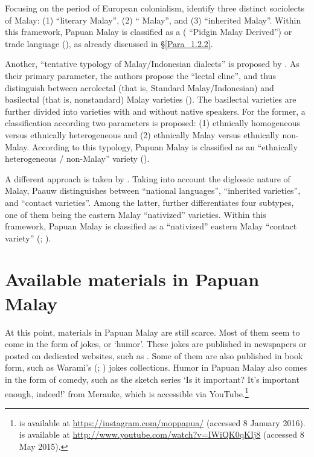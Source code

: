 {Focusing on the period of European colonialism, \cite{Adelaar.1996} identify three distinct sociolects of Malay: (1)  ``literary Malay'', (2)  `` Malay'', and (3)  ``inherited Malay''. Within this framework, Papuan Malay is classified as a ( ``Pidgin Malay Derived'')  or trade language (\citeyear*[675]{Adelaar.1996}), as already discussed in §\ref{Para_1.2.2}.



Another,  ``tentative typology of Malay/Indonesian dialects'' is proposed by \cite{Gil.1997}. As their primary parameter, the authors propose the  ``lectal cline'', and thus distinguish between acrolectal (that is, Standard Malay/Indonesian) and basilectal (that is, nonstandard) Malay varieties (\citeyear*[1]{Gil.1997}). The basilectal varieties are further divided into varieties with and without native speakers. For the former, a classification according two parameters is proposed: (1) ethnically homogeneous versus ethnically heterogeneous and (2) ethnically Malay versus ethnically non-Malay. According to this typology, Papuan Malay is classified as an  ``ethnically heterogeneous / non-Malay'' variety (\citeyear*[1]{Gil.1997}).



A different approach is taken by \citet{Paauw.2005, Paauw.2007}. Taking into account the diglossic nature of Malay, Paauw distinguishes between  ``national languages'',  ``inherited varieties'', and  ``contact varieties''. Among the latter, \citet[2]{Paauw.2007} further differentiates four subtypes, one of them being the eastern Malay  ``nativized'' varieties. Within this framework, Papuan Malay is classified as a  ``nativized'' eastern Malay  ``contact variety'' (\citeyear*[2]{Paauw.2007}; \citealt[see also][14]{Paauw.2005}).


\section{Available materials in Papuan Malay}\label{Para_1.10}
At this point, materials in Papuan Malay are still scarce. Most of them seem to come in the form of jokes, or  ‘humor’. These jokes are published in newspapers or posted on dedicated websites, such as . Some of them are also published in book form, such as Warami’s (\citeyear*{Warami.2003}; \citeyear*{Warami.2004}) jokes collections. Humor in Papuan Malay also comes in the form of comedy, such as the sketch series  ‘Is it important? It’s important enough, indeed!’ from Merauke, which is accessible via YouTube.\footnote{
 is available at \url{https://instagram.com/moppapua/} (accessed 8 January 2016).\\
 is available at \url{http://www.youtube.com/watch?v=IWiQK0qKIj8} (accessed 8 May 2015).
}



}
